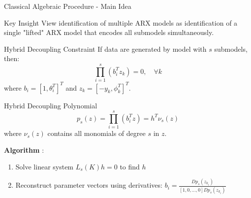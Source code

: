 \documentclass[aspectratio=169]{beamer}
\begin{document}
\begin{frame}{Classical Algebraic Procedure - Main Idea}
\begin{block}{Key Insight}
View identification of multiple ARX models as identification of a single "lifted" ARX model that encodes all submodels simultaneously.
\end{block}

\begin{block}{Hybrid Decoupling Constraint}
If data are generated by model with $s$ submodels, then:
$$\prod_{i=1}^s (b_i^T z_k) = 0, \quad \forall k$$
where $b_i = [1, \theta_i^T]^T$ and $z_k = [-y_k, \phi_k^T]^T$.
\end{block}

\begin{block}{Hybrid Decoupling Polynomial}
$$p_s(z) = \prod_{i=1}^s (b_i^T z) = h^T \nu_s(z)$$
where $\nu_s(z)$ contains all monomials of degree $s$ in $z$.
\end{block}

\textbf{Algorithm} \cite{vidal2003algebraic,ma2005identification}:
\begin{enumerate}
\item Solve linear system $L_s(K) h = 0$ to find $h$
\item Reconstruct parameter vectors using derivatives: $b_i = \frac{D p_s(z_{k_i})}{[1, 0, \ldots, 0] D p_s(z_{k_i})}$
\end{enumerate}
\end{frame}
\end{document}
